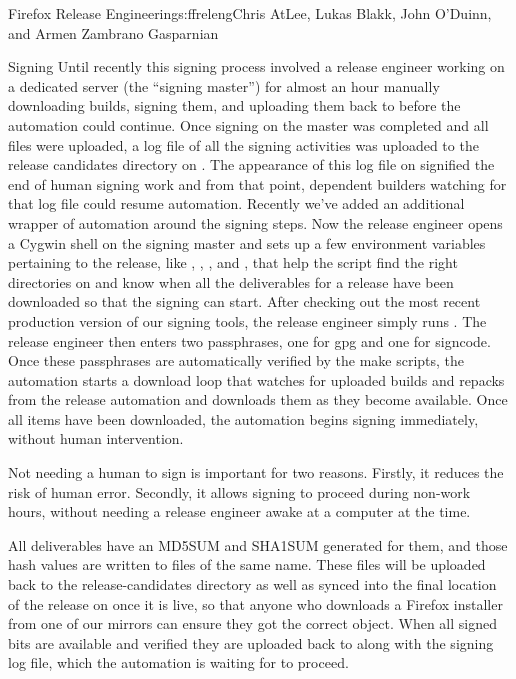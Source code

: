 \begin{aosachapter}{Firefox Release Engineering}{s:ffreleng}{Chris AtLee, Lukas Blakk, John O'Duinn, and Armen Zambrano Gasparnian}
\begin{aosasect1}{Signing}
Until recently this signing process involved a release engineer
working on a dedicated server (the ``signing master'') for almost an
hour manually downloading builds, signing them, and
uploading them back to  before the automation could
continue.  Once signing on the master was completed and all files were
uploaded, a log file of all the signing activities was uploaded to
the release candidates directory on .  The appearance
of this log file on  signified the end of human signing
work and from that point, dependent builders watching for that log
file could resume automation.  Recently we've added an additional
wrapper of automation around the signing steps. Now the release engineer 
opens a Cygwin shell on the signing master
and sets up a few environment variables pertaining to the release, like
, , , and , that
help the script find the right directories on  and know
when all the deliverables for a release have been downloaded so that
the signing can start. After checking out the most recent production
version of our signing tools, the release engineer simply runs
. The release engineer then enters two
passphrases, one for gpg and one for signcode. Once these passphrases
are automatically verified by the make scripts, the automation
starts a download loop that watches for uploaded builds and repacks
from the release automation and downloads them as they become
available.  Once all items have been downloaded, the automation
begins signing immediately, without human intervention. 

Not needing a
human to sign is important for two reasons. Firstly, it reduces the
risk of human error. Secondly, it allows signing to
proceed during non-work hours, without needing a release engineer
awake at a computer at the time.  

All deliverables have an MD5SUM and SHA1SUM generated for them, and
those hash values are written to files of the same name.  These files
will be uploaded back to the release-candidates directory as well as
synced into the final location of the release on  once
it is live, so that anyone who downloads a Firefox installer from one of our
mirrors can ensure they got the correct object. When all signed bits
are available and verified 
 they are uploaded back to  along
with the signing log file, which the automation is waiting for to
proceed.



\end{aosasect1}
\end{aosachapter}
